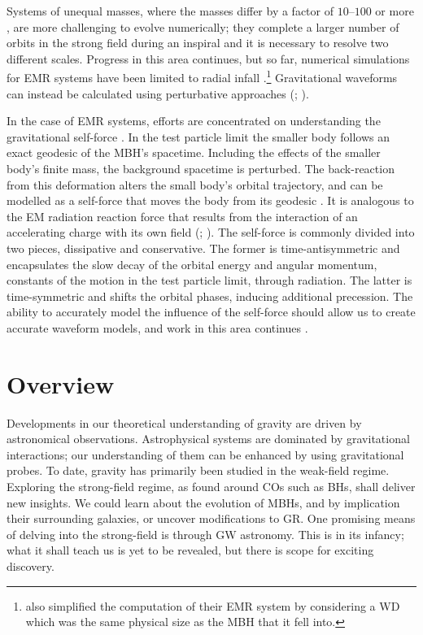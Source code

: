 Systems of unequal masses, where the masses differ by a factor of $10$--$100$ or more \citep{Lousto2010,Lousto2011}, are more challenging to evolve numerically; they complete a larger number of orbits in the strong field during an inspiral and it is necessary to resolve two different scales. Progress in this area continues, but so far, numerical simulations for EMR systems have been limited to radial infall \citep{East2012}.\footnote{\citet{East2012} also simplified the computation of their EMR system by considering a WD which was the same physical size as the MBH that it fell into.} Gravitational waveforms can instead be calculated using perturbative approaches (\citealt{Teukolsky1973}; \citealt[chapter 9]{Chandrasekhar1992}).

In the case of EMR systems, efforts are concentrated on understanding the gravitational self-force \citep{Barack2009,Poisson2004}. In the test particle limit the smaller body follows an exact geodesic of the MBH's spacetime. Including the effects of the smaller body's finite mass, the background spacetime is perturbed. The back-reaction from this deformation alters the small body's orbital trajectory, and can be modelled as a self-force that moves the body from its geodesic \citep{Mino1997,Quinn1997,Gralla2008}. It is analogous to the EM radiation reaction force that results from the interaction of an accelerating charge with its own field (\citealt{Dirac1938}; \citealt[sections 16.1--16.3]{Jackson1999}). The self-force is commonly divided into two pieces, dissipative and conservative. The former is time-antisymmetric and encapsulates the slow decay of the orbital energy and angular momentum, constants of the motion in the test particle limit, through radiation. The latter is time-symmetric and shifts the orbital phases, inducing additional precession. The ability to accurately model the influence of the self-force should allow us to create accurate waveform models, and work in this area continues \citep[e.g.,][]{Pound2012}.

\section{Overview}

Developments in our theoretical understanding of gravity are driven by astronomical observations. Astrophysical systems are dominated by gravitational interactions; our understanding of them can be enhanced by using gravitational probes. To date, gravity has primarily been studied in the weak-field regime. Exploring the strong-field regime, as found around COs such as BHs, shall deliver new insights. We could learn about the evolution of MBHs, and by implication their surrounding galaxies, or uncover modifications to GR. One promising means of delving into the strong-field is through GW astronomy. This is in its infancy; what it shall teach us is yet to be revealed, but there is scope for exciting discovery.

